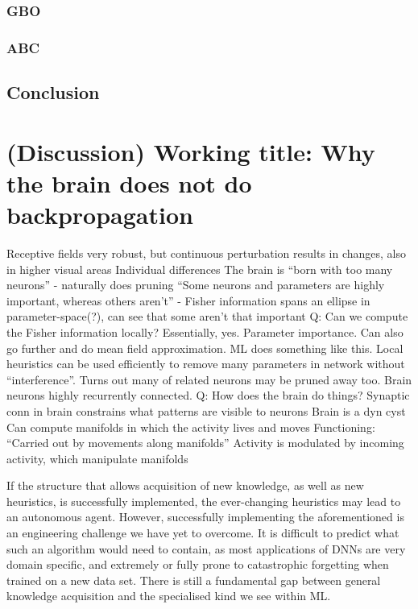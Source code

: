 \documentclass[mphil,deptreport,ai]{infthesis} %
\begin{document}
\subsection{GBO}

\subsection{ABC}

\section{Conclusion}



\chapter{(Discussion) Working title: Why the brain does not do backpropagation}

Receptive fields very robust, but continuous perturbation results in changes, also in higher visual areas
Individual differences
The brain is “born with too many neurons” - naturally does pruning
“Some neurons and parameters are highly important, whereas others aren’t” - Fisher information spans an ellipse in parameter-space(?), can see that some aren’t that important
Q: Can we compute the Fisher information locally? Essentially, yes. Parameter importance. Can also go further and do mean field approximation. ML does something like this. Local heuristics can be used efficiently to remove many parameters in network without “interference”. Turns out many of related neurons may be pruned away too.
Brain neurons highly recurrently connected.
Q: How does the brain do things?
Synaptic conn in brain constrains what patterns are visible to neurons
Brain is a dyn cyst
Can compute manifolds in which the activity lives and moves
Functioning: “Carried out by movements along manifolds”
Activity is modulated by incoming activity, which manipulate manifolds


If the structure that allows acquisition of new knowledge, as well as new heuristics, is successfully implemented, the ever-changing heuristics may lead to an autonomous agent. 
However, successfully implementing the aforementioned is an engineering challenge we have yet to overcome. It is difficult to predict what such an algorithm would need to contain, as most applications of DNNs are very domain specific, and extremely or fully prone to catastrophic forgetting when trained on a new data set.
There is still a fundamental gap between general knowledge acquisition and the specialised kind we see within ML.
\end{document}
